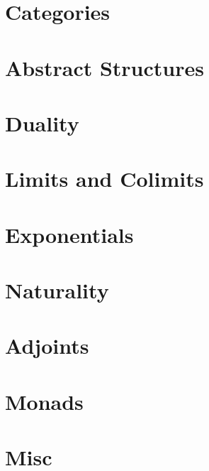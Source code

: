 \documentclass{article}
\theoremstyle{definition}
\theoremstyle{remark}
\begin{document}
\section{Categories}


\section{Abstract Structures}



\section{Duality}




\section{Limits and Colimits}





\section{Exponentials}



\section{Naturality}




\section{Adjoints}


\section{Monads}


\section{Misc}

\end{document}
